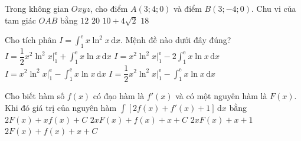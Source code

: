\begin{ex}%
Trong không gian $Oxyz$, cho điểm $A(3;4;0)$ và điểm $B(3;-4;0)$. Chu vi của tam giác $OAB$ bằng
\choice
{$12$}
{$20$}
{$10+4\sqrt{2}$}
{\True $18$}
\end{ex}

\begin{ex}%
Cho tích phân $I=\displaystyle\int_1^{\mathrm{e}} x\ln ^2 x \mathrm{\,d}x$. Mệnh đề nào dưới đây đúng?
\choice
{$I=\dfrac{1}{2} x^2\ln ^2 x\bigg|_1^{\mathrm{e}}+\displaystyle\int_1^{\mathrm{e}} x\ln x \mathrm{\,d}x$}
{$I=x^2\ln ^2 x\bigg|_1^{\mathrm{e}}-2\displaystyle\int_1^{\mathrm{e}} x\ln x \mathrm{\,d}x$}
{$I=x^2\ln ^2 x\bigg|_1^{\mathrm{e}}-\displaystyle\int_1^{\mathrm{e}} x\ln x \mathrm{\,d}x$}
{\True $I=\dfrac{1}{2} x^2\ln ^2 x\bigg|_1^{\mathrm{e}}-\displaystyle\int_1^{\mathrm{e}} x\ln x \mathrm{\,d}x$}
\end{ex}

\begin{ex}%
Cho biết hàm số $f(x)$ có đạo hàm là $f'(x)$ và có một nguyên hàm là $F(x)$. Khi đó giá trị của nguyên hàm $\displaystyle\int\left[2 f(x)+f'(x)+1\right]\mathrm{\,d}x$ bằng
\choice
{$2 F(x)+x f(x)+C$}
{$2x F(x)+f(x)+x+C$}
{$2x F(x)+x+1$}
{\True $2 F(x)+f(x)+x+C$}
\end{ex}


